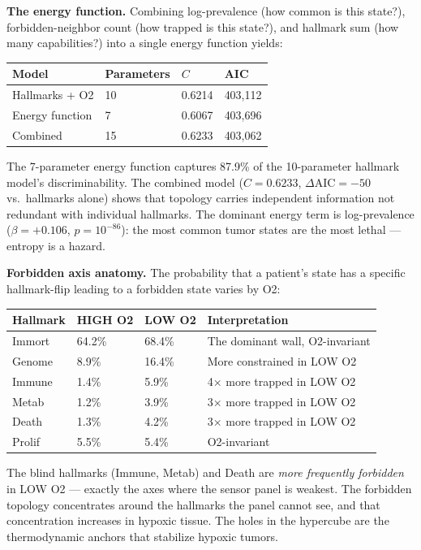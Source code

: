 \documentclass[
  11pt,
]{article}
\newcounter{none} %
\begin{document}
\textbf{The energy function.} Combining log-prevalence (how common is
this state?), forbidden-neighbor count (how trapped is this state?), and
hallmark sum (how many capabilities?) into a single energy function
yields:

{\def\LTcaptype{none} %
\begin{longtable}[]{@{}llll@{}}
\toprule\noalign{}
Model & Parameters & \(C\) & AIC \\
\midrule\noalign{}
\endhead
\bottomrule\noalign{}
\endlastfoot
Hallmarks + O2 & 10 & 0.6214 & 403,112 \\
Energy function & 7 & 0.6067 & 403,696 \\
Combined & 15 & 0.6233 & 403,062 \\
\end{longtable}
}

The 7-parameter energy function captures 87.9\% of the 10-parameter
hallmark model's discriminability. The combined model (\(C = 0.6233\),
\(\Delta\mathrm{AIC} = -50\) vs.~hallmarks alone) shows that topology
carries independent information not redundant with individual hallmarks.
The dominant energy term is log-prevalence (\(\beta = +0.106\),
\(p = 10^{-86}\)): the most common tumor states are the most lethal ---
entropy is a hazard.

\textbf{Forbidden axis anatomy.} The probability that a patient's state
has a specific hallmark-flip leading to a forbidden state varies by O2:

{\def\LTcaptype{none} %
\begin{longtable}[]{@{}llll@{}}
\toprule\noalign{}
Hallmark & HIGH O2 & LOW O2 & Interpretation \\
\midrule\noalign{}
\endhead
\bottomrule\noalign{}
\endlastfoot
Immort & 64.2\% & 68.4\% & The dominant wall, O2-invariant \\
Genome & 8.9\% & 16.4\% & More constrained in LOW O2 \\
Immune & 1.4\% & 5.9\% & 4× more trapped in LOW O2 \\
Metab & 1.2\% & 3.9\% & 3× more trapped in LOW O2 \\
Death & 1.3\% & 4.2\% & 3× more trapped in LOW O2 \\
Prolif & 5.5\% & 5.4\% & O2-invariant \\
\end{longtable}
}

The blind hallmarks (Immune, Metab) and Death are \emph{more frequently
forbidden} in LOW O2 --- exactly the axes where the sensor panel is
weakest. The forbidden topology concentrates around the hallmarks the
panel cannot see, and that concentration increases in hypoxic tissue.
The holes in the hypercube are the thermodynamic anchors that stabilize
hypoxic tumors.
\end{document}
